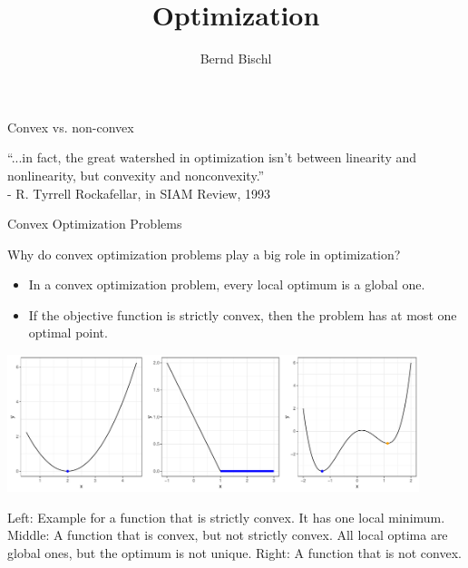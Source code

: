 





\newcommand{\titlefigure}{figure_man/hinge_vs_l2.pdf}
\newcommand{\learninggoals}{
\item Convex vs. Non-Convex
\item Convex set \& functions}



\title{Optimization}
\author{Bernd Bischl}
\date{}



\sloppy


\begin{vbframe}{Convex vs. non-convex}

\vspace*{2cm}

\begin{center}
\Large{\enquote{...in fact, the great watershed in optimization isn't between linearity and nonlinearity, but convexity and nonconvexity.}}\\
\normalsize - R. Tyrrell Rockafellar, in SIAM Review, 1993
\end{center}

	
\end{vbframe}

\begin{vbframe}{Convex Optimization Problems}
  
  Why do convex optimization problems play a big role in optimization? 
  
  \begin{itemize}
    \item In a convex optimization problem, every local optimum is a global one.  
    \item If the objective function is strictly convex, then the problem has at most one optimal point. 
  \end{itemize}
  
  \begin{center}
  \includegraphics[width = 0.9\textwidth]{figure_man/convexity_3.pdf} \\
  \begin{footnotesize}
  Left: Example for a function that is strictly convex. It has one local minimum. Middle: A function that is convex, but not strictly convex. All local optima are global ones, but the optimum is not unique. Right: A function that is not convex. 
  \end{footnotesize} 
  \end{center}
  
\end{vbframe}

